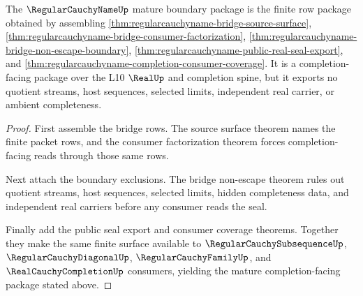 \begin{theorem}
\label{thm:regularcauchyname-mature-boundary-package}
The $\RegularCauchyNameUp$ mature boundary package is the finite row package obtained by assembling \autoref{thm:regularcauchyname-bridge-source-surface}, \autoref{thm:regularcauchyname-bridge-consumer-factorization}, \autoref{thm:regularcauchyname-bridge-non-escape-boundary}, \autoref{thm:regularcauchyname-public-real-seal-export}, and \autoref{thm:regularcauchyname-completion-consumer-coverage}. It is a completion-facing package over the L10 $\RealUp$ and completion spine, but it exports no quotient streams, host sequences, selected limits, independent real carrier, or ambient completeness.
\end{theorem}
\begin{proof}
First assemble the bridge rows. The source surface theorem names the finite packet rows, and the consumer factorization theorem forces completion-facing reads through those same rows.

Next attach the boundary exclusions. The bridge non-escape theorem rules out quotient streams, host sequences, selected limits, hidden completeness data, and independent real carriers before any consumer reads the seal.

Finally add the public seal export and consumer coverage theorems. Together they make the same finite surface available to $\RegularCauchySubsequenceUp$, $\RegularCauchyDiagonalUp$, $\RegularCauchyFamilyUp$, and $\RealCauchyCompletionUp$ consumers, yielding the mature completion-facing package stated above.
\end{proof}

